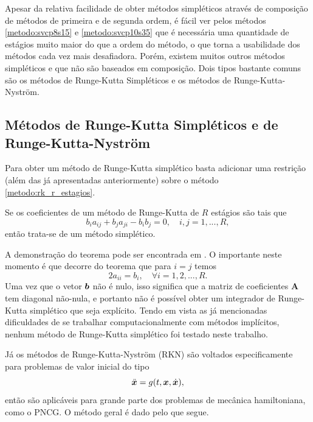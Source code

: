 Apesar da relativa facilidade de obter métodos simpléticos através de composição de métodos de primeira e de segunda ordem, é fácil ver pelos métodos \ref{metodo:svcp8s15} e \ref{metodo:svcp10s35} que é necessária uma quantidade de estágios muito maior do que a ordem do método, o que torna a usabilidade dos métodos cada vez mais desafiadora. Porém, existem muitos outros métodos simpléticos e que não são baseados em composição. Dois tipos bastante comuns são os métodos de Runge-Kutta Simpléticos e os métodos de Runge-Kutta-Nyström.

\subsection{Métodos de Runge-Kutta Simpléticos e de Runge-Kutta-Nyström}
Para obter um método de Runge-Kutta simplético basta adicionar uma restrição (além das já apresentadas anteriormente) sobre o método \ref{metodo:rk_r_estagios}.

\begin{theorem}\label{teorema:rk_simpletico}
    Se os coeficientes de um método de Runge-Kutta de $R$ estágios são tais que
    \begin{equation*}
        b_i a_{ij} + b_j a_{ji} - b_i b_j = 0, \quad i, j = 1, ..., R, 
    \end{equation*}
    então trata-se de um método simplético.
\end{theorem}

A demonstração do teorema pode ser encontrada em \cite[152-154]{Leimkuhler2005}. O importante neste momento é que decorre do teorema que para $i=j$ temos
\begin{equation*}
    2 a_{ii} = b_i, \quad \forall i = 1, 2, ..., R.
\end{equation*}
Uma vez que o vetor $\bm b$ não é nulo, isso significa que a matriz de coeficientes $\bm A$ tem diagonal não-nula, e portanto não é possível obter um integrador de Runge-Kutta simplético que seja explícito. Tendo em vista as já mencionadas dificuldades de se trabalhar computacionalmente com métodos implícitos, nenhum método de Runge-Kutta simplético foi testado neste trabalho.

Já os métodos de Runge-Kutta-Nyström (RKN) são voltados especificamente para problemas de valor inicial do tipo
\begin{equation*}
    \ddot {\bm x} = g(t, \bm x, \dot {\bm x}),
\end{equation*}
então são aplicáveis para grande parte dos problemas de mecânica hamiltoniana, como o PNCG. O método geral é dado pelo que segue.

